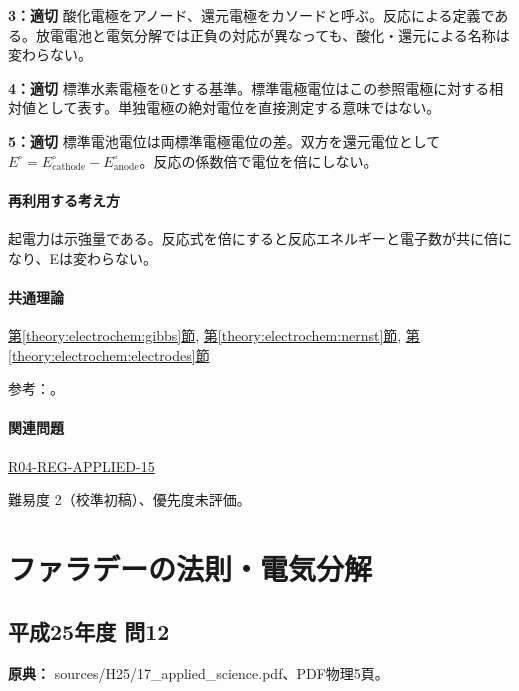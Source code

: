 \noindent\textbf{3：適切} 酸化電極をアノード、還元電極をカソードと呼ぶ。反応による定義である。放電電池と電気分解では正負の対応が異なっても、酸化・還元による名称は変わらない。\par

\noindent\textbf{4：適切} 標準水素電極を0とする基準。標準電極電位はこの参照電極に対する相対値として表す。単独電極の絶対電位を直接測定する意味ではない。\par

\noindent\textbf{5：適切} 標準電池電位は両標準電極電位の差。双方を還元電位として \(E^\circ=E^\circ_{\mathrm{cathode}}-E^\circ_{\mathrm{anode}}\)。反応の係数倍で電位を倍にしない。\par

\paragraph{再利用する考え方} 起電力は示強量である。反応式を倍にすると反応エネルギーと電子数が共に倍になり、Eは変わらない。

\paragraph{共通理論} \hyperref[theory:electrochem:gibbs]{第\ref*{theory:electrochem:gibbs}節}, \hyperref[theory:electrochem:nernst]{第\ref*{theory:electrochem:nernst}節}, \hyperref[theory:electrochem:electrodes]{第\ref*{theory:electrochem:electrodes}節}

\par 参考：\cite{openstax_cell_gibbs,mit_redox2014}。

\paragraph{関連問題} \hyperref[q:r04-reg-applied-15]{R04-REG-APPLIED-15}

\par 難易度 2（校準初稿）、優先度未評価。

\section{ファラデーの法則・電気分解}

\subsection{平成25年度 問12}
\label{q:h25-reg-applied-12}

\noindent\textbf{原典：} sources/H25/17\_applied\_science.pdf、PDF物理5頁。

